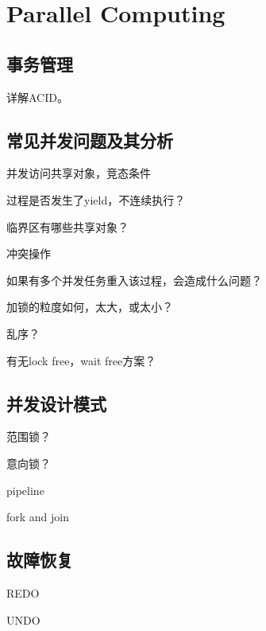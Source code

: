 \chapter{Parallel Computing}

\section{事务管理}

详解ACID。

\section{常见并发问题及其分析}

并发访问共享对象，竞态条件

\begin{enumbox}
\item 过程是否发生了yield，不连续执行？
\item 临界区有哪些共享对象？
\item 冲突操作
\item 如果有多个并发任务重入该过程，会造成什么问题？
\item 加锁的粒度如何，太大，或太小？
\item 乱序？
\item 有无lock free，wait free方案？
\end{enumbox}

\section{并发设计模式}

范围锁？

意向锁？

\begin{compactitem}
    \item pipeline
    \item fork and join
\end{compactitem}

\section{故障恢复}

REDO

UNDO
